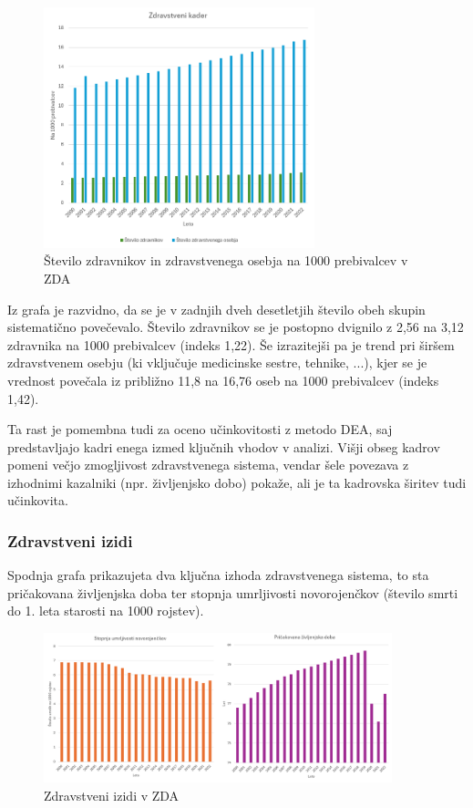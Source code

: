 \documentclass[12pt,a4paper]{article}
\theoremstyle{definition}
\begin{document}
\begin{figure}[H]
    \centering
    \includegraphics[width=0.7\textwidth]{zda_stevilo_zdravnikov.png}
    \caption{Število zdravnikov in zdravstvenega osebja na 1000 prebivalcev v ZDA}
    \label{fig:zda_stevilo_zdravnikov}
\end{figure}

Iz grafa je razvidno, da se je v zadnjih dveh desetletjih število obeh skupin sistematično povečevalo. 
Število zdravnikov se je postopno dvignilo z 2,56 na 3,12 zdravnika na 1000 prebivalcev (indeks 1,22). 
Še izrazitejši pa je trend pri širšem zdravstvenem osebju (ki vključuje medicinske sestre, tehnike, ...), 
kjer se je vrednost povečala iz približno 11,8 na 16,76 oseb na 1000 prebivalcev (indeks 1,42).

Ta rast je pomembna tudi za oceno učinkovitosti z metodo DEA, saj predstavljajo kadri enega izmed ključnih vhodov v analizi. 
Višji obseg kadrov pomeni večjo zmogljivost zdravstvenega sistema, vendar šele povezava z izhodnimi kazalniki 
(npr. življenjsko dobo) pokaže, ali je ta kadrovska širitev tudi učinkovita.

\subsubsection{Zdravstveni izidi}

Spodnja grafa prikazujeta dva ključna izhoda zdravstvenega sistema, to sta
pričakovana življenjska doba ter stopnja umrljivosti novorojenčkov (število smrti do 1. leta starosti na 1000 rojstev).

\begin{figure}[H]
    \centering
    \includegraphics[width=0.9\textwidth]{zda_zdravstveni_izzidi.png}
    \caption{Zdravstveni izidi v ZDA}
    \label{fig:zda_zdravstveni_izzidi}
\end{figure}
\end{document}
